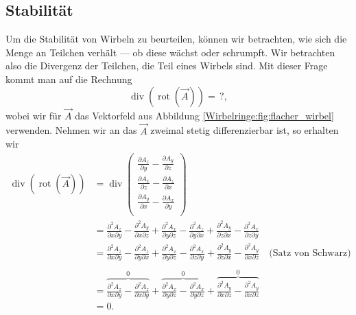 \subsection{Stabilität}

Um die Stabilität von Wirbeln zu beurteilen, können wir betrachten, wie sich die Menge an Teilchen verhält --- ob diese wächst oder schrumpft. 
Wir betrachten also die Divergenz der Teilchen, die Teil eines Wirbels sind.
Mit dieser Frage kommt man auf die Rechnung
\[
\operatorname{div} ( \operatorname{rot} ( \vec{A} ) )
= %
\,?,
\]
wobei wir für \(\vec{A}\) das Vektorfeld aus Abbildung \ref{Wirbelringe:fig:flacher_wirbel} verwenden.
Nehmen wir an das \(\vec{A}\) zweimal stetig differenzierbar ist, so erhalten wir
\begin{align*}
\operatorname{div} ( \operatorname{rot} ( \vec{A} ) )
&=
\operatorname{div}      
    \begin{pmatrix} 
        \frac{\partial A_z}{\partial y} - \frac{\partial A_y}{\partial z} \\ 
        \frac{\partial A_x}{\partial z} - \frac{\partial A_z}{\partial x} \\ 
        \frac{\partial A_y}{\partial x} - \frac{\partial A_x}{\partial y} \\ 
    \end{pmatrix} \\
&=
\frac{\partial^2 A_z}{\partial x \partial y} - \frac{\partial^2 A_y}{\partial x \partial z} + 
\frac{\partial^2 A_x}{\partial y \partial z} - \frac{\partial^2 A_z}{\partial y \partial x} +
\frac{\partial^2 A_y}{\partial z \partial x} - \frac{\partial^2 A_x}{\partial z \partial y}
\\
&=
\frac{\partial^2 A_z}{\partial x \partial y} - \frac{\partial^2 A_z}{\partial y \partial x} + 
\frac{\partial^2 A_x}{\partial y \partial z} - \frac{\partial^2 A_x}{\partial z \partial y} +
\frac{\partial^2 A_y}{\partial z \partial x} - \frac{\partial^2 A_y}{\partial x \partial z}
\quad \text{(Satz von Schwarz)}\\
\\
&=
\overbrace{\frac{\partial^2 A_z}{\partial x \partial y} - \frac{\partial^2 A_z}{\partial x \partial y}}^0 + 
\overbrace{\frac{\partial^2 A_x}{\partial y \partial z} - \frac{\partial^2 A_x}{\partial y \partial z}}^0 +
\overbrace{\frac{\partial^2 A_y}{\partial x \partial z} - \frac{\partial^2 A_y}{\partial x \partial z}}^0
\\
&=
0.
\end{align*}

